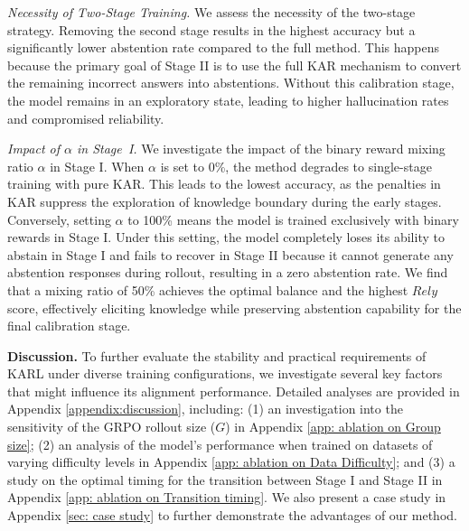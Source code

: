 \documentclass{article} %
\newcommand{\rewardname}{\textsc{KAR}}
\newcommand{\framename}{\textsc{KARL}}
\begin{document}
\textit{Necessity of Two-Stage Training.} We assess the necessity of the two-stage strategy.
Removing the second stage results in the highest accuracy but a significantly lower abstention rate compared to the full method.
This happens because the primary goal of Stage II is to use the full \rewardname{} mechanism to convert the remaining incorrect answers into abstentions.
Without this calibration stage, the model remains in an exploratory state, leading to higher hallucination rates and compromised  reliability.

\textit{Impact of $\alpha$ in Stage~I.} We investigate the impact of the binary reward mixing ratio $\alpha$ in Stage I.
When $\alpha$ is set to 0\%, the method degrades to single-stage training with pure \rewardname{}.
This leads to the lowest accuracy, as the penalties in \rewardname{} suppress the exploration of knowledge boundary during the early stages.
Conversely, setting $\alpha$ to 100\% means the model is trained exclusively with binary rewards in Stage I.
Under this setting, the model completely loses its ability to abstain in Stage I and fails to recover in Stage II because it cannot generate any abstention responses during rollout, resulting in a zero abstention rate.
We find that a mixing ratio of 50\% achieves the optimal balance and the highest $Rely$ score, effectively eliciting knowledge while preserving abstention capability for the final calibration stage.


\textbf{Discussion.}
To further evaluate the stability and practical requirements of \framename{} under diverse training configurations, we investigate several key factors that might influence its alignment performance. Detailed analyses are provided in Appendix \ref{appendix:discussion}, including: (1) an investigation into the sensitivity of the GRPO rollout size ($G$) in Appendix \ref{app: ablation on Group size}; (2) an analysis of the model's performance when trained on datasets of varying difficulty levels in Appendix \ref{app: ablation on Data Difficulty}; and (3) a study on the optimal timing for the transition between Stage I and Stage II in Appendix \ref{app: ablation on Transition timing}.
We also present a case study in Appendix \ref{sec: case study} to further demonstrate the advantages of our method.
\end{document}
